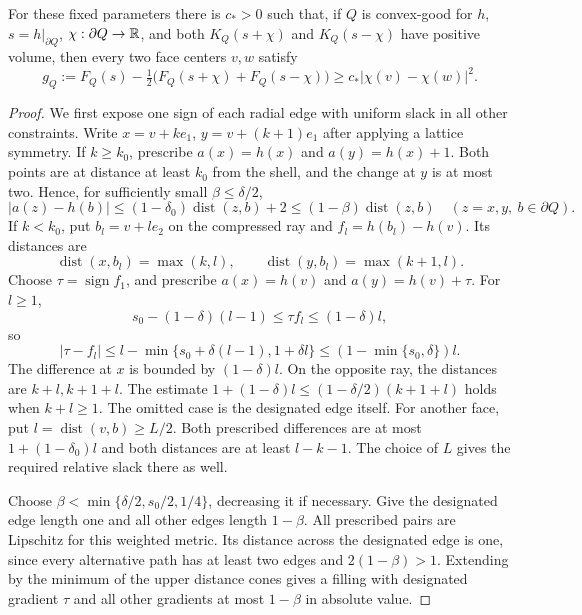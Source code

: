 

\begin{lemma}\label{f:block}
For these fixed parameters there is $c_*>0$ such that, if $Q$ is
convex-good for $h$, $s=h|_{\partial Q}$,
$\chi:\partial Q\to\mathbb R$, and both $K_Q(s+\chi)$ and
$K_Q(s-\chi)$ have positive volume, then every two face centers $v,w$
satisfy
\begin{equation}\label{f:block-deficit}
 g_Q:=F_Q(s)-\tfrac12\bigl(F_Q(s+\chi)+F_Q(s-\chi)\bigr)
 \ge c_*|\chi(v)-\chi(w)|^2.
\end{equation}
\end{lemma}
\begin{proof}
We first expose one sign of each radial edge with uniform slack in all
other constraints. Write $x=v+ke_1$, $y=v+(k+1)e_1$ after applying a lattice
symmetry. If $k\ge k_0$, prescribe $a(x)=h(x)$ and $a(y)=h(x)+1$.
Both points are at distance at least $k_0$ from the shell, and the change
at $y$ is at most two. Hence, for sufficiently small $\beta\le\delta/2$,
\[
 |a(z)-h(b)|\le(1-\delta_0)\operatorname{dist}(z,b)+2
 \le(1-\beta)\operatorname{dist}(z,b)
 \quad(z=x,y,\ b\in\partial Q).
\]
If $k<k_0$, put $b_l=v+le_2$ on the compressed ray and
$f_l=h(b_l)-h(v)$. Its distances are
\[
 \operatorname{dist}(x,b_l)=\max(k,l),\qquad
 \operatorname{dist}(y,b_l)=\max(k+1,l).
\]
Choose $\tau=\operatorname{sign}f_1$, and prescribe
$a(x)=h(v)$ and $a(y)=h(v)+\tau$. For $l\ge1$,
\[
 s_0-(1-\delta)(l-1)\le\tau f_l\le(1-\delta)l,
\]
so
\begin{equation}\label{f:triangular-slack}
 |\tau-f_l|\le l-\min\{s_0+\delta(l-1),1+\delta l\}
 \le(1-\min\{s_0,\delta\})l.
\end{equation}
The difference at $x$ is bounded by $(1-\delta)l$. On the opposite ray,
the distances are $k+l,k+1+l$. The estimate
$1+(1-\delta)l\le(1-\delta/2)(k+1+l)$ holds when $k+l\ge1$.
The omitted case is the designated edge itself. For another face, put
$l=\operatorname{dist}(v,b)\ge L/2$. Both prescribed differences are at
most $1+(1-\delta_0)l$ and both distances are at least $l-k-1$.
The choice of $L$ gives the required relative slack there as well.

Choose $\beta<\min\{\delta/2,s_0/2,1/4\}$, decreasing it if necessary.
Give the designated edge length one and all other edges length $1-\beta$.
All prescribed pairs are Lipschitz for this weighted metric. Its distance
across the designated edge is one, since every alternative path has at
least two edges and $2(1-\beta)>1$. Extending by the minimum of the upper
distance cones gives a filling with designated gradient $\tau$ and all
other gradients at most $1-\beta$ in absolute value.


\end{proof}
